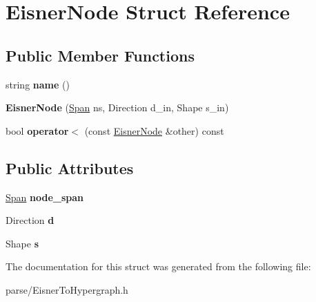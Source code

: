 \hypertarget{structEisnerNode}{
\section{EisnerNode Struct Reference}
\label{structEisnerNode}
}
\subsection*{Public Member Functions}
\begin{DoxyCompactItemize}
\item 
\hypertarget{structEisnerNode_a38fe91d99e35e7d8a6bda3c1bb45f3d6}{
string {\bfseries name} ()}
\label{structEisnerNode_a38fe91d99e35e7d8a6bda3c1bb45f3d6}

\item 
\hypertarget{structEisnerNode_a16b4c3b130c5cacf4639fb8fc01d1894}{
{\bfseries EisnerNode} (\hyperlink{structSpan}{Span} ns, Direction d\_\-in, Shape s\_\-in)}
\label{structEisnerNode_a16b4c3b130c5cacf4639fb8fc01d1894}

\item 
\hypertarget{structEisnerNode_a8ede91dac02b136ef673afbb68566623}{
bool {\bfseries operator$<$} (const \hyperlink{structEisnerNode}{EisnerNode} \&other) const }
\label{structEisnerNode_a8ede91dac02b136ef673afbb68566623}

\end{DoxyCompactItemize}
\subsection*{Public Attributes}
\begin{DoxyCompactItemize}
\item 
\hypertarget{structEisnerNode_a1e3b0f200089af99ca744d6d0a9c7f72}{
\hyperlink{structSpan}{Span} {\bfseries node\_\-span}}
\label{structEisnerNode_a1e3b0f200089af99ca744d6d0a9c7f72}

\item 
\hypertarget{structEisnerNode_a0013abe4607fb7979aa1d915a58868a1}{
Direction {\bfseries d}}
\label{structEisnerNode_a0013abe4607fb7979aa1d915a58868a1}

\item 
\hypertarget{structEisnerNode_a682edd0712304525c84939b820a141d3}{
Shape {\bfseries s}}
\label{structEisnerNode_a682edd0712304525c84939b820a141d3}

\end{DoxyCompactItemize}


The documentation for this struct was generated from the following file:\begin{DoxyCompactItemize}
\item 
parse/EisnerToHypergraph.h\end{DoxyCompactItemize}
